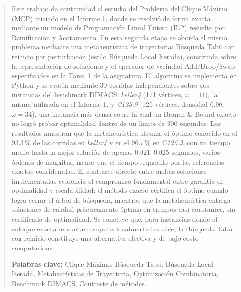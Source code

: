\begin{abstract}
Este trabajo da continuidad al estudio del Problema del Clique Máximo (MCP) iniciado en el Informe 1, donde se resolvió de forma exacta mediante un modelo de Programación Lineal Entera (ILP) resuelto por Ramificación y Acotamiento. En esta segunda etapa se aborda el mismo problema mediante una metaheurística de trayectoria: Búsqueda Tabú con reinicio por perturbación (estilo Búsqueda Local Iterada), construida sobre la representación de soluciones y el operador de vecindad Add/Drop/Swap especificados en la Tarea 1 de la asignatura. El algoritmo se implementa en Python y se evalúa mediante 30 corridas independientes sobre dos instancias del benchmark DIMACS: \textit{keller4} (171 vértices, $\omega=11$), la misma utilizada en el Informe 1, y \textit{C125.9} (125 vértices, densidad 0.90, $\omega=34$), una instancia más densa sobre la cual un Branch \& Bound exacto no logró probar optimalidad dentro de un límite de 300 segundos. Los resultados muestran que la metaheurística alcanza el óptimo conocido en el 93.3\,\% de las corridas en \textit{keller4} y en el 96.7\,\% en \textit{C125.9}, con un tiempo medio hasta la mejor solución de apenas 0.021--0.025 segundos, varios órdenes de magnitud menor que el tiempo requerido por las referencias exactas consideradas. El contraste directo entre ambas soluciones implementadas evidencia el compromiso fundamental entre garantía de optimalidad y escalabilidad: el método exacto certifica el óptimo cuando logra cerrar el árbol de búsqueda, mientras que la metaheurística entrega soluciones de calidad prácticamente óptima en tiempos casi constantes, sin certificado de optimalidad. Se concluye que, para instancias donde el enfoque exacto se vuelve computacionalmente inviable, la Búsqueda Tabú con reinicio constituye una alternativa efectiva y de bajo costo computacional.

\vspace{0.4cm}
\noindent \textbf{Palabras clave:} Clique Máximo, Búsqueda Tabú, Búsqueda Local Iterada, Metaheurísticas de Trayectoria, Optimización Combinatoria, Benchmark DIMACS, Contraste de métodos.
\end{abstract}
